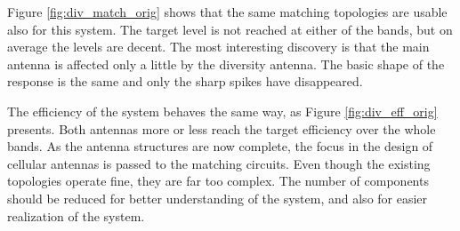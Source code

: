 Figure \ref{fig:div_match_orig} shows that the same matching topologies are usable also for this system. The target level is not reached at either of the bands, but on average the levels are decent. The most interesting discovery is that the main antenna is affected only a little by the diversity antenna. The basic shape of the response is the same and only the sharp spikes have disappeared. 

The efficiency of the system behaves the same way, as Figure \ref{fig:div_eff_orig} presents. Both antennas more or less reach the target efficiency over the whole bands. As the antenna structures are now complete, the focus in the design of cellular antennas is passed to the matching circuits. Even though the existing topologies operate fine, they are far too complex. The number of components should be reduced for better understanding of the system, and also for easier realization of the system.
